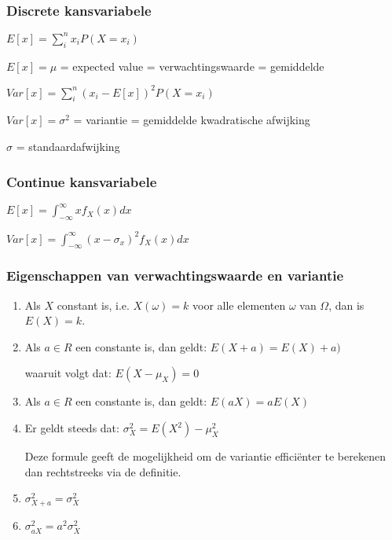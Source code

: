 \documentclass[a4paper,12pt]{article}
\begin{document}
\subsubsection{Discrete kansvariabele}
$E[x]= \sum_i^nx_iP(X=x_i)$

$E[x] = \mu$ = expected value = verwachtingswaarde = gemiddelde

$Var[x]=\sum_i^n(x_i-E[x])^2P(X=x_i)$

$Var[x] = \sigma^2$ = variantie = gemiddelde kwadratische afwijking

$\sigma$ = standaardafwijking

\subsubsection{Continue kansvariabele}
$E[x]=\int^\infty_{-\infty}xf_X(x)dx$

$Var[x]=\int^\infty_{-\infty}(x-\sigma_x)^2f_X(x)dx$

\subsubsection{Eigenschappen van verwachtingswaarde en variantie}
\begin{enumerate}
\item Als $X$ constant is, i.e. $X(\omega)=k$ voor alle elementen $\omega$ van  $\Omega$, dan is $E(X)=k$.
\item Als $a \in R$ een constante is, dan geldt:
$E(X+a)=E(X)+a)$

waaruit volgt dat: $E(X-\mu_X)=0$
\item Als $ a \in R$ een constante is, dan geldt:
$E(aX)=aE(X)$
\item Er geldt steeds dat:
$\sigma^2_X=E(X^2)-\mu^2_X$

Deze formule geeft de mogelijkheid om de variantie efficiënter te berekenen dan rechtstreeks via de definitie.
\item $\sigma^2_{X+a}=\sigma^2_X$
\item $\sigma^2_{aX}=a^2\sigma^2_X$
\end{enumerate}
\end{document}
